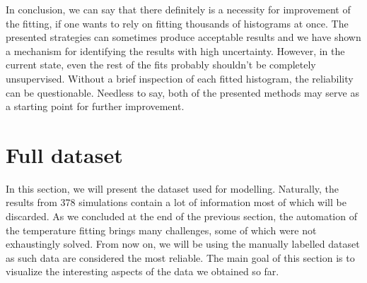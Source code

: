 In conclusion, we can say that there definitely is a necessity for improvement of the fitting, if one wants to rely on fitting thousands of histograms at once. The presented strategies can sometimes produce acceptable results and we have shown a mechanism for identifying the results with high uncertainty. However, in the current state, even the rest of the fits probably shouldn't be completely unsupervised. Without a brief inspection of each fitted histogram, the reliability can be questionable. Needless to say, both of the presented methods may serve as a starting point for further improvement.



\newpage
\section{Full dataset}
In this section, we will present the dataset used for modelling. Naturally, the results from 378 simulations contain a lot of information most of which will be discarded. As we concluded at the end of the previous section, the automation of the temperature fitting brings many challenges, some of which were not exhaustingly solved. From now on, we will be using the manually labelled dataset as such data are considered the most reliable. The main goal of this section is to visualize the interesting aspects of the data we obtained so far.
